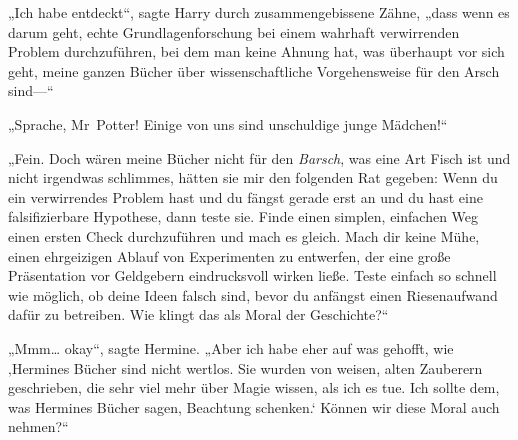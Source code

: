 „Ich habe entdeckt“, sagte Harry durch zusammengebissene Zähne, „dass wenn es darum geht, echte Grundlagenforschung bei einem wahrhaft verwirrenden Problem durchzuführen, bei dem man keine Ahnung hat, was überhaupt vor sich geht, meine ganzen Bücher über wissenschaftliche Vorgehensweise für den Arsch sind—“

„Sprache, Mr~Potter! Einige von uns sind unschuldige junge Mädchen!“

„Fein. Doch wären meine Bücher nicht für den \emph{Barsch}, was eine Art Fisch ist und nicht irgendwas schlimmes, hätten sie mir den folgenden Rat gegeben: Wenn du ein verwirrendes Problem hast und du fängst gerade erst an und du hast eine falsifizierbare Hypothese, dann teste sie. Finde einen simplen, einfachen Weg einen ersten Check durchzuführen und mach es gleich. Mach dir keine Mühe, einen ehrgeizigen Ablauf von Experimenten zu entwerfen, der eine große Präsentation vor Geldgebern eindrucksvoll wirken ließe. Teste einfach so schnell wie möglich, ob deine Ideen falsch sind, bevor du anfängst einen Riesenaufwand dafür zu betreiben. Wie klingt das als Moral der Geschichte?“

„Mmm… okay“, sagte Hermine. „Aber ich habe eher auf was gehofft, wie ‚Hermines Bücher sind nicht wertlos. Sie wurden von weisen, alten Zauberern geschrieben, die sehr viel mehr über Magie wissen, als ich es tue. Ich sollte dem, was Hermines Bücher sagen, Beachtung schenken.‘ Können wir diese Moral auch nehmen?“

